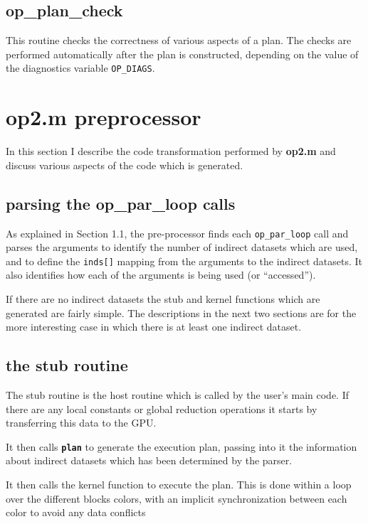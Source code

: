 \documentclass[12pt]{article}
\begin{document}
\subsection{op\_plan\_check}

This routine checks the correctness of various aspects of a plan.  The checks 
are performed automatically after the plan is constructed, depending on the
value of the diagnostics variable {\tt OP\_DIAGS}.


\newpage

\section{op2.m preprocessor}

In this section I describe the code transformation performed by
{\bf op2.m} and discuss various aspects of the code which is generated.

\subsection{parsing the op\_par\_loop calls}

As explained in Section 1.1, the pre-processor finds each 
{\tt op\_par\_loop} call 
and parses the arguments to identify the number of indirect 
datasets which are used, and to define the {\tt inds[]} mapping 
from the arguments to the indirect datasets.  It also identifies 
how each of the arguments is being used (or ``accessed'').

If there are no indirect datasets the stub and kernel functions
which are generated are fairly simple.  The descriptions in the next 
two sections are for the more interesting case in which there is
at least one indirect dataset.

\subsection{the stub routine}

The stub routine is the host routine which is called by the user's 
main code.  If there are any local constants or global reduction 
operations it starts by transferring this data to the GPU.

It then calls {\tt \bf plan} to generate the execution plan, 
passing into it the information about indirect datasets which 
has been determined by the parser.

It then calls the kernel function to execute the plan.  This is 
done within a loop over the different blocks colors, with an
implicit synchronization between each color to avoid any data 
conflicts
\end{document}

